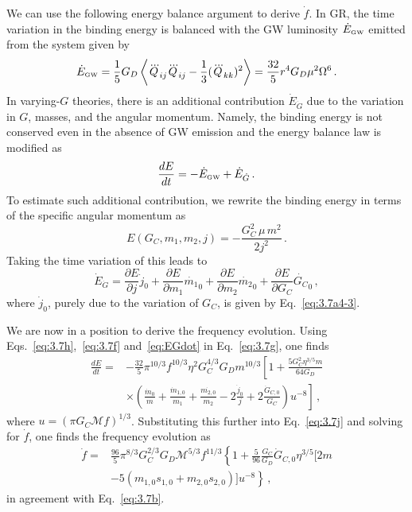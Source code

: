 \documentclass[prd,twocolumn,nofootinbib]{revtex4-1}
\newcommand{\GW}{{\mbox{\tiny GW}}}
\begin{document}
We can use the following energy balance argument to derive $\dot f$. 
In GR, the time variation in the binding energy is balanced with the GW luminosity $\dot{E}_{\GW}$ emitted from the system given by
 \begin{equation}\label{eq:3.7h}
 \dot{E}_{\GW}=\frac{1}{5}G_D\left \langle\dddot{Q}_{ij}\dddot{Q}_{ij}-\frac{1}{3}(\dddot{Q}_{kk})^2\right \rangle=\frac{32}{5} r^4 G_D \mu ^2 \Omega ^6\,.
 \end{equation}
In varying-$G$ theories, there is an additional contribution $\dot E_{\dot G}$ due to the variation in $G$, masses, and the angular momentum. Namely, the binding energy is not conserved even in the absence of GW emission and the energy balance law is modified as
\begin{equation}
\label{eq:3.7g}
\frac{d E}{d t}=-\dot{E}_{\GW} + \dot E_{\dot G}\,.
\end{equation}
%
 To estimate such additional contribution, we rewrite the binding energy in terms of the specific angular momentum as
 \begin{equation}\label{eq:3.7f}
 E(G_C,m_1,m_2,j)=-\frac{G_C^2\, \mu \, m^2}{2 j^2}\,.
 \end{equation}
Taking the time variation of this leads to
\begin{equation}
\label{eq:EGdot}
\dot E_{\dot G}=\frac{\partial E}{\partial j}\dot{j}_0+\frac{\partial E}{\partial m_1}\dot{m_1}_0+\frac{\partial E}{\partial m_2}\dot{m_2}_0+\frac{\partial E}{\partial G_C}\dot{G_C}_0\,,
 \end{equation}
where $\dot{j}_0$, purely due to the variation of $G_C$, is given by Eq.~\eqref{eq:3.7a4-3}. 


We are now in a position to derive the frequency evolution. 
Using Eqs.~\eqref{eq:3.7h},~\eqref{eq:3.7f} and~\eqref{eq:EGdot} in Eq.~\eqref{eq:3.7g}, one finds
 \begin{align}\label{eq:3.7i}
\frac{dE}{dt}=&-\frac{32}{5} \pi ^{10/3} f^{10/3} \eta ^2 G_C^{4/3}G_D m^{10/3}\left[1+ \frac{5 G_C^2 \eta^{3/5} m}{64G_D} \right. \nonumber\\ & \left. \times \left(\frac{\dot{m}_0}{m}+\frac{\dot{m}_{1,0}}{m_1}+\frac{\dot{m_{2,0}}}{m_2}-2\frac{\dot{j}_0}{j}+2\frac{\dot{G}_{C,0}}{G_C}\right)u^{-8}\right]\,,
 \end{align}
where $u=(\pi G_C \mathcal{M}f)^{1/3}$. Substituting this further into Eq.~\eqref{eq:3.7j} and solving for $\dot f$, one finds the frequency evolution as
 \begin{align} 
 \dot{f}=&\frac{96}{5}\pi^{8/3}G_C^{2/3}G_D\mathcal{M}^{5/3}f^{11/3}\left\{1+\frac{5}{96}\frac{G_C}{G_D} \dot{G}_{C,0} \eta^{3/5}[2m\right.\nonumber\\ 
 & \left.-5(m_{1,0}s_{1,0}+m_{2,0}s_{2,0})] u^{-8}\right\}\,,
 \end{align} 
in agreement with Eq.~\eqref{eq:3.7b}.
\end{document}
